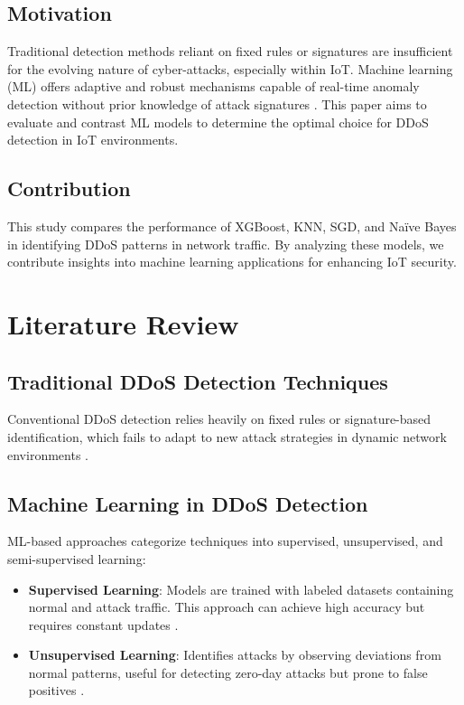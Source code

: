 \documentclass[conference]{IEEEtran}
\begin{document}
\subsection{Motivation}
Traditional detection methods reliant on fixed rules or signatures are insufficient for the evolving nature of cyber-attacks, especially within IoT. Machine learning (ML) offers adaptive and robust mechanisms capable of real-time anomaly detection without prior knowledge of attack signatures \cite{zargar2013survey}. This paper aims to evaluate and contrast ML models to determine the optimal choice for DDoS detection in IoT environments.

\subsection{Contribution}
This study compares the performance of XGBoost, KNN, SGD, and Naïve Bayes in identifying DDoS patterns in network traffic. By analyzing these models, we contribute insights into machine learning applications for enhancing IoT security. 

\section{Literature Review}

\subsection{Traditional DDoS Detection Techniques}
Conventional DDoS detection relies heavily on fixed rules or signature-based identification, which fails to adapt to new attack strategies in dynamic network environments \cite{mirkovic2004taxonomy}.

\subsection{Machine Learning in DDoS Detection}
ML-based approaches categorize techniques into supervised, unsupervised, and semi-supervised learning:
\begin{itemize}
    \item \textbf{Supervised Learning}: Models are trained with labeled datasets containing normal and attack traffic. This approach can achieve high accuracy but requires constant updates \cite{sommer2010closed}.
    \item \textbf{Unsupervised Learning}: Identifies attacks by observing deviations from normal patterns, useful for detecting zero-day attacks but prone to false positives \cite{divekar2018benchmarking}.
\end{itemize}
\end{document}
